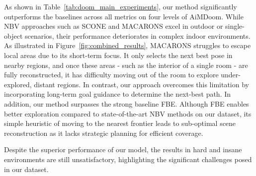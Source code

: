 


As shown in Table~\ref{tab:doom_main_experiments}, our method significantly outperforms the baselines across all metrics on four levels of AiMDoom. 
While NBV approaches such as SCONE and MACARONS excel in outdoor or single-object scenarios, their performance deteriorates in complex indoor environments. 
As illustrated in Figure~\ref{fig:combined_results}, MACARONS struggles to escape local areas due to its short-term focus. It only selects the next best pose in nearby regions, and once these areas - such as the interior of a single room - are fully reconstructed, it has difficulty moving out of the room to explore under-explored, distant regions.
In contrast, our approach overcomes this limitation by incorporating long-term goal guidance to determine the next-best path.
%
In addition, our method surpasses the strong baseline FBE. Although FBE enables better exploration compared to state-of-the-art NBV methods on our dataset, its simple heuristic of moving to the nearest frontier leads to sub-optimal scene reconstruction as it lacks strategic planning for efficient coverage. 


Despite the superior performance of our model, the results in hard and insane environments are still unsatisfactory, highlighting the significant challenges posed in our dataset.


